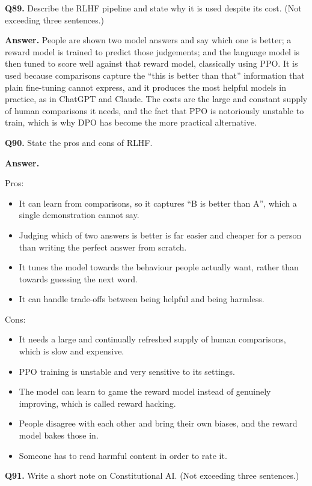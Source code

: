 \documentclass[11pt]{article}
\begin{document}
\medskip
\textbf{Q89.} Describe the RLHF pipeline and state why it is used despite its cost. (Not
exceeding three sentences.)

\textbf{Answer.} People are shown two model answers and say which one is better; a reward
model is trained to predict those judgements; and the language model is then tuned to score
well against that reward model, classically using PPO. It is used because comparisons capture
the ``this is better than that'' information that plain fine-tuning cannot express, and it
produces the most helpful models in practice, as in ChatGPT and Claude. The costs are the
large and constant supply of human comparisons it needs, and the fact that PPO is notoriously
unstable to train, which is why DPO has become the more practical alternative.

\medskip
\textbf{Q90.} State the pros and cons of RLHF.

\textbf{Answer.}

Pros:
\begin{itemize}
  \item It can learn from comparisons, so it captures ``B is better than A'', which a single demonstration cannot say.
  \item Judging which of two answers is better is far easier and cheaper for a person than writing the perfect answer from scratch.
  \item It tunes the model towards the behaviour people actually want, rather than towards guessing the next word.
  \item It can handle trade-offs between being helpful and being harmless.
\end{itemize}

Cons:
\begin{itemize}
  \item It needs a large and continually refreshed supply of human comparisons, which is slow and expensive.
  \item PPO training is unstable and very sensitive to its settings.
  \item The model can learn to game the reward model instead of genuinely improving, which is called reward hacking.
  \item People disagree with each other and bring their own biases, and the reward model bakes those in.
  \item Someone has to read harmful content in order to rate it.
\end{itemize}

\medskip
\textbf{Q91.} Write a short note on Constitutional AI. (Not exceeding three sentences.)
\end{document}
